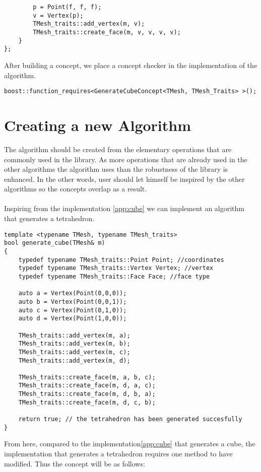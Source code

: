 \begin{appendices}
\begin{lstlisting}
		p = Point(f, f, f);
		v = Vertex(p);
		TMesh_traits::add_vertex(m, v);
		TMesh_traits::create_face(m, v, v, v, v);
	}
};
\end{lstlisting}

After building a concept, we place a concept checker in the implementation
of the algorithm.

\begin{lstlisting}
boost::function_requires<GenerateCubeConcept<TMesh, TMesh_Traits> >();
\end{lstlisting}

\section{Creating a new Algorithm}

The algorithm should be created from the elementary operations that are commonly used in the
library. As more operations that are already used in the other algorithms
the algorithm uses than the robustness of the library is enhanced. In the other words,
user should let himself be inspired by the other algorithms so the concepts overlap as a result.
\\
\\
Inspiring from the implementation \ref{app:cube} we can implement an algorithm that generates
a tetrahedron.
\begin{lstlisting}
template <typename TMesh, typename TMesh_traits>
bool generate_cube(TMesh& m)
{
	typedef typename TMesh_traits::Point Point; //coordinates
	typedef typename TMesh_traits::Vertex Vertex; //vertex
	typedef typename TMesh_traits::Face Face; //face type
	
	auto a = Vertex(Point(0,0,0));
	auto b = Vertex(Point(0,0,1));
	auto c = Vertex(Point(0,1,0));
	auto d = Vertex(Point(1,0,0));
	
	TMesh_traits::add_vertex(m, a);
	TMesh_traits::add_vertex(m, b);
	TMesh_traits::add_vertex(m, c);
	TMesh_traits::add_vertex(m, d);

	TMesh_traits::create_face(m, a, b, c);
	TMesh_traits::create_face(m, d, a, c);
	TMesh_traits::create_face(m, d, b, a);
	TMesh_traits::create_face(m, d, c, b);
	
	return true; // the tetrahedron has been generated succesfully
}
\end{lstlisting}

From here, compared to the implementation\ref{app:cube} that generates a cube, the implementation
that generates a tetrahedron requires one method to have modified. Thus the concept will be as follows:


\end{appendices}
